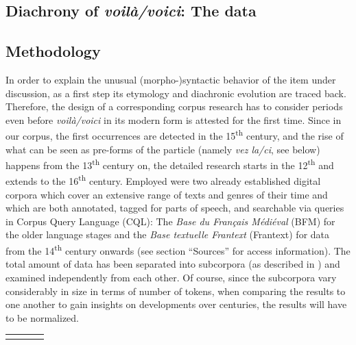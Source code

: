 \documentclass[output=paper]{langscibook}
\begin{document}
\begin{itemize}
\begin{itemize}
\begin{itemize}
\begin{itemize}
\begin{itemize}
\begin{itemize}
\begin{itemize}
\section{Diachrony of \textit{voilà/voici}: The data}
\subsection{Methodology}

In order to explain the unusual (morpho-)syntactic behavior of the item under discussion, as a first step its etymology and diachronic evolution are traced back. Therefore, the design of a corresponding corpus research has to consider periods even before \textit{voilà/voici} in its modern form is attested for the first time. Since in our corpus, the first occurrences are detected in the 15\textsuperscript{th} century, and the rise of what can be seen as pre-forms of the particle (namely \textit{vez la/ci}, see below) happens from the 13\textsuperscript{th} century on, the detailed research starts in the 12\textsuperscript{th} and extends to the 16\textsuperscript{th} century. Employed were two already established digital corpora which cover an extensive range of texts and genres of their time and which are both annotated, tagged for parts of speech, and searchable via queries in Corpus Query Language (CQL): The \textit{Base du Français Médiéval} (BFM) for the older language stages and the \textit{Base textuelle Frantext} (Frantext) for data from the 14\textsuperscript{th} century onwards (see section “Sources” for access information). The total amount of data has been separated into subcorpora (as described in ) and examined independently from each other. Of course, since the subcorpora vary considerably in size in terms of number of tokens, when comparing the results to one another to gain insights on developments over centuries, the results will have to be normalized. 


\begin{tabularx}{\textwidth}{XXXX}

\lsptoprule


\end{tabularx}
\end{itemize}
\end{itemize}
\end{itemize}
\end{itemize}
\end{itemize}
\end{itemize}
\end{itemize}
\end{document}
